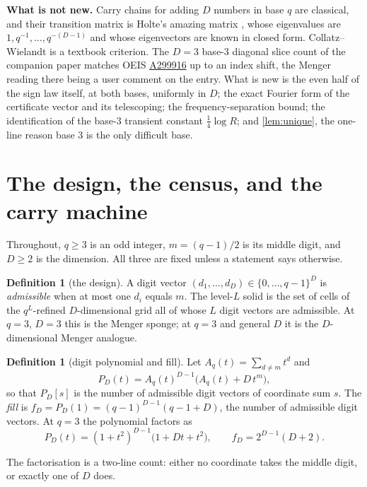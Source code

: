 \documentclass[11pt]{amsart}
\theoremstyle{definition}
\newtheorem{definition}[theorem]{Definition}
\theoremstyle{remark}
\begin{document}
\medskip
\noindent\textbf{What is not new.} Carry chains for adding $D$ numbers in base $q$ are classical, and their transition matrix is Holte's amazing matrix \cite{holte}, whose eigenvalues are $1, q^{-1}, \dots, q^{-(D-1)}$ and whose eigenvectors are known in closed form. Collatz--Wielandt is a textbook criterion. The $D = 3$ base-$3$ diagonal slice count of the companion paper matches OEIS \href{https://oeis.org/A299916}{A299916} \cite{oeisA299916} up to an index shift, the Menger reading there being a user comment on the entry. What is new is the even half of the sign law itself, at both bases, uniformly in $D$; the exact Fourier form of the certificate vector and its telescoping; the frequency-separation bound; the identification of the base-$3$ transient constant $\tfrac14\log R$; and \cref{lem:unique}, the one-line reason base $3$ is the only difficult base.


\section{The design, the census, and the carry machine}
\label{sec:defs}

Throughout, $q \ge 3$ is an odd integer, $m = (q-1)/2$ is its middle digit, and $D \ge 2$ is the dimension. All three are fixed unless a statement says otherwise.

\begin{definition}[the design]
\label{def:design}
A digit vector $(d_1,\dots,d_D) \in \{0,\dots,q-1\}^D$ is \emph{admissible} when at most one $d_i$ equals $m$. The level-$L$ solid is the set of cells of the $q^L$-refined $D$-dimensional grid all of whose $L$ digit vectors are admissible. At $q = 3$, $D = 3$ this is the Menger sponge; at $q = 3$ and general $D$ it is the $D$-dimensional Menger analogue.
\end{definition}

\begin{definition}[digit polynomial and fill]
\label{def:poly}
Let $A_q(t) = \sum_{d \ne m} t^d$ and
\[
  P_D(t) = A_q(t)^{D-1}\bigl(A_q(t) + D\,t^m\bigr),
\]
so that $P_D[s]$ is the number of admissible digit vectors of coordinate sum $s$. The \emph{fill} is $f_D = P_D(1) = (q-1)^{D-1}(q-1+D)$, the number of admissible digit vectors. At $q = 3$ the polynomial factors as
\[
  P_D(t) = (1+t^2)^{D-1}\bigl(1 + Dt + t^2\bigr), \qquad f_D = 2^{D-1}(D+2).
\]
\end{definition}

The factorisation is a two-line count: either no coordinate takes the middle digit, or exactly one of $D$ does.
\end{document}
